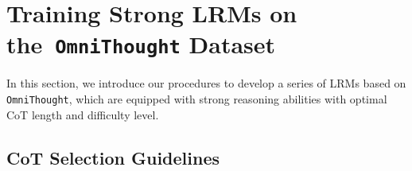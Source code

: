 \documentclass{article}
\begin{document}




\section{Training Strong LRMs on the~\texttt{OmniThought} Dataset}

In this section, we introduce our procedures to develop a series of LRMs based on \texttt{OmniThought}, which are equipped with strong reasoning abilities with optimal CoT length and difficulty level.


\subsection{CoT Selection Guidelines}
\end{document}
